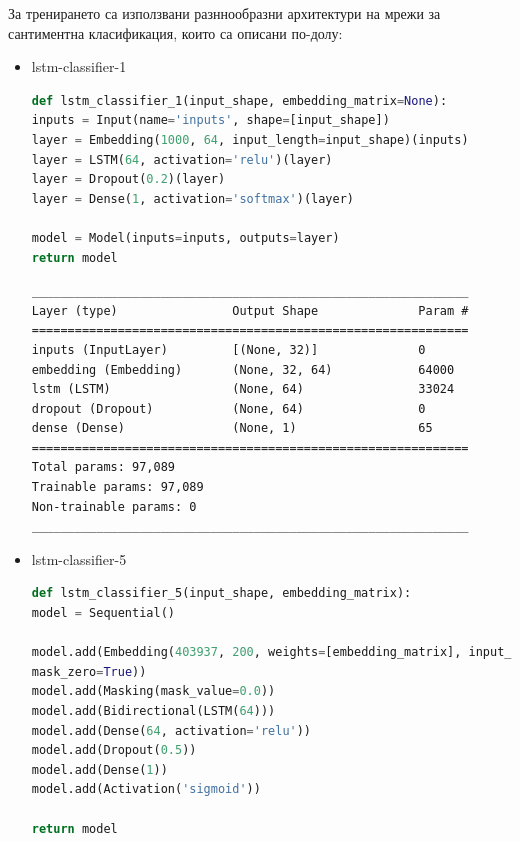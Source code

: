 \documentclass{article}
\begin{document}
За тренирането са използвани разннообразни архитектури на мрежи за сантиментна класификация, които са описани по-долу:

\begin{itemize}
\item lstm-classifier-1

\begin{lstlisting}[language=Python, caption=Дефиниция на lstm-classifier-1.]
def lstm_classifier_1(input_shape, embedding_matrix=None):
inputs = Input(name='inputs', shape=[input_shape])
layer = Embedding(1000, 64, input_length=input_shape)(inputs)
layer = LSTM(64, activation='relu')(layer)
layer = Dropout(0.2)(layer)
layer = Dense(1, activation='softmax')(layer)

model = Model(inputs=inputs, outputs=layer)
return model
\end{lstlisting}

\begin{lstlisting}[numbers=none, caption=Обобщение на lstm-classifier-1.]
_____________________________________________________________
Layer (type)                Output Shape              Param #
=============================================================
inputs (InputLayer)         [(None, 32)]              0
embedding (Embedding)       (None, 32, 64)            64000
lstm (LSTM)                 (None, 64)                33024
dropout (Dropout)           (None, 64)                0
dense (Dense)               (None, 1)                 65
=============================================================
Total params: 97,089
Trainable params: 97,089
Non-trainable params: 0
_____________________________________________________________
\end{lstlisting}

\item lstm-classifier-5

\begin{lstlisting}[language=Python, caption=Дефиниция на lstm-classifier-5.]
def lstm_classifier_5(input_shape, embedding_matrix):
model = Sequential()

model.add(Embedding(403937, 200, weights=[embedding_matrix], input_length=input_shape, trainable=False,
mask_zero=True))
model.add(Masking(mask_value=0.0))
model.add(Bidirectional(LSTM(64)))
model.add(Dense(64, activation='relu'))
model.add(Dropout(0.5))
model.add(Dense(1))
model.add(Activation('sigmoid'))

return model
\end{lstlisting}


\end{itemize}
\end{document}
